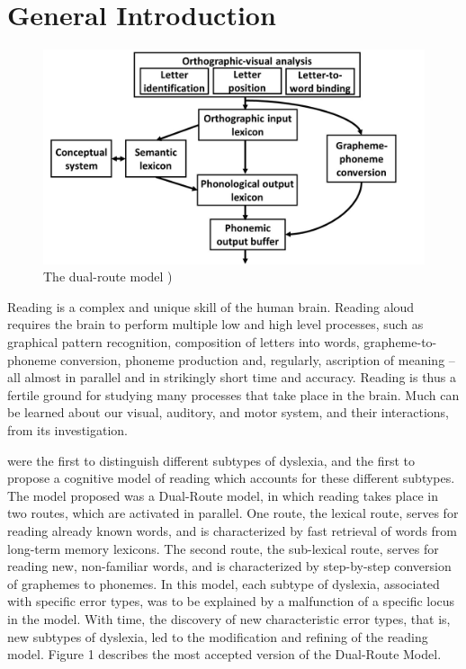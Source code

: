 \chapter*{General Introduction}
\begin{figure}[H]
\vspace{.3in}
\includegraphics[width=\linewidth]{Figures/Ch1/DualRoute}
\caption{The dual-route model \citep{friedmann2016types})}
\end{figure}

Reading is a complex and unique skill of the human brain. Reading aloud requires the brain to perform multiple low and high level processes, such as graphical pattern recognition, composition of letters into words, grapheme-to-phoneme conversion, phoneme production and, regularly, ascription of meaning – all almost in parallel and in strikingly short time and accuracy. Reading is thus a fertile ground for studying many processes that take place in the brain. Much can be learned about our visual, auditory, and motor system, and their interactions, from its investigation.

\citet{mn73} were the first to distinguish different subtypes of dyslexia, and the first to propose a cognitive model of reading which accounts for these different subtypes. The model proposed was a Dual-Route model, in which reading takes place in two routes, which are activated in parallel. One route, the lexical route, serves for reading already known words, and is characterized by fast retrieval of words from long-term memory lexicons. The second route, the sub-lexical route, serves for reading new, non-familiar words, and is characterized by step-by-step conversion of graphemes to phonemes. In this model, each subtype of dyslexia, associated with specific error types, was to be explained by a malfunction of a specific locus in the model. With time, the discovery of new characteristic error types, that is, new subtypes of dyslexia, led to the modification and refining of the reading model. Figure 1 describes the most accepted version of the Dual-Route Model.

